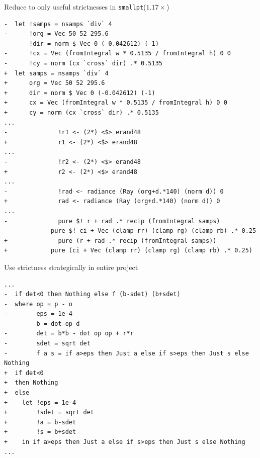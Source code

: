 \documentclass[8pt]{beamer}
\begin{document}
\begin{frame}[fragile]{Reduce to only useful strictnesses in \texttt{smallpt}($1.17\times$)}
\begin{verbatim}
-  let !samps = nsamps `div` 4
-      !org = Vec 50 52 295.6
-      !dir = norm $ Vec 0 (-0.042612) (-1)
-      !cx = Vec (fromIntegral w * 0.5135 / fromIntegral h) 0 0
-      !cy = norm (cx `cross` dir) .* 0.5135
+  let samps = nsamps `div` 4
+      org = Vec 50 52 295.6
+      dir = norm $ Vec 0 (-0.042612) (-1)
+      cx = Vec (fromIntegral w * 0.5135 / fromIntegral h) 0 0
+      cy = norm (cx `cross` dir) .* 0.5135
...
-              !r1 <- (2*) <$> erand48
+              r1 <- (2*) <$> erand48
...
-              !r2 <- (2*) <$> erand48
+              r2 <- (2*) <$> erand48
...
-              !rad <- radiance (Ray (org+d.*140) (norm d)) 0
+              rad <- radiance (Ray (org+d.*140) (norm d)) 0
...
-              pure $! r + rad .* recip (fromIntegral samps)
-            pure $! ci + Vec (clamp rr) (clamp rg) (clamp rb) .* 0.25
+              pure (r + rad .* recip (fromIntegral samps))
+            pure (ci + Vec (clamp rr) (clamp rg) (clamp rb) .* 0.25)
\end{verbatim}

\end{frame}

\begin{frame}[fragile]{Use strictness strategically in entire project}
\begin{verbatim}
...
-  if det<0 then Nothing else f (b-sdet) (b+sdet)
-  where op = p - o
-        eps = 1e-4
-        b = dot op d
-        det = b*b - dot op op + r*r
-        sdet = sqrt det
-        f a s = if a>eps then Just a else if s>eps then Just s else Nothing
+  if det<0
+  then Nothing
+  else
+    let !eps = 1e-4
+        !sdet = sqrt det
+        !a = b-sdet
+        !s = b+sdet
+    in if a>eps then Just a else if s>eps then Just s else Nothing
...
\end{verbatim}


\end{frame}
\end{document}
